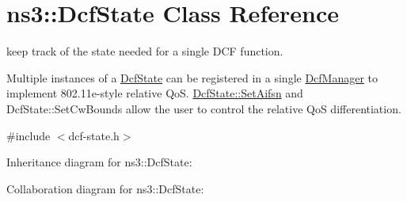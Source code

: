 \hypertarget{classns3_1_1DcfState}{}\section{ns3\+:\+:Dcf\+State Class Reference}
\label{classns3_1_1DcfState}


keep track of the state needed for a single D\+CF function.

Multiple instances of a \hyperlink{classns3_1_1DcfState}{Dcf\+State} can be registered in a single \hyperlink{classns3_1_1DcfManager}{Dcf\+Manager} to implement 802.\+11e-\/style relative QoS. \hyperlink{classns3_1_1DcfState_ae957a4ab4e518d5efd50bb8640dd07c5}{Dcf\+State\+::\+Set\+Aifsn} and Dcf\+State\+::\+Set\+Cw\+Bounds allow the user to control the relative QoS differentiation.  




{\ttfamily \#include $<$dcf-\/state.\+h$>$}



Inheritance diagram for ns3\+:\+:Dcf\+State\+:


Collaboration diagram for ns3\+:\+:Dcf\+State\+:

